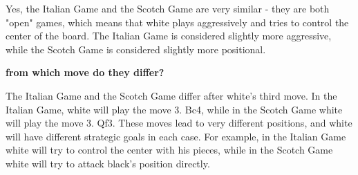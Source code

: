 \documentclass[11pt]{article}
\begin{document}
\begin{framed}
\begin{minipage}{.9\textwidth}
\vspace{1em}

Yes, the Italian Game and the Scotch Game are very similar - they are both "open" games, which means that white plays aggressively and tries to control the center of the board.  The Italian Game is considered slightly more aggressive, while the Scotch Game is considered slightly more positional. 
\vspace{1em}

\textbf{from which move do they differ?}

\vspace{1em}

The Italian Game and the Scotch Game differ after white's third move.  In the Italian Game, white will play the move 3. Bc4, while in the Scotch Game white will play the move 3. Qf3.  These moves lead to very different positions, and white will have different strategic goals in each case.  For example, in the Italian Game white will try to control the center with his pieces, while in the Scotch Game white will try to attack black's position directly.
\end{minipage}
\vspace{.5em}
\end{framed}
\end{document}
